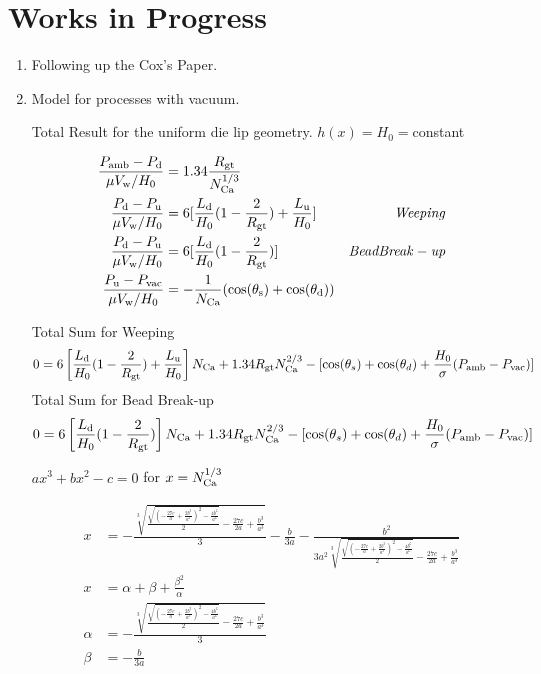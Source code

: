 \documentclass{article}
\begin{document}
\section{Works in Progress}
\begin{enumerate}
\item Following up the Cox's Paper.

\clearpage
\item Model for processes with vacuum. \newline 

Total Result for the uniform die lip geometry. $ h(x)=H_0 =$constant

\begin{align*} 
\frac{P_\textup{amb}-P_\textup{d}}{\mu V_\textup{w}/H_0} & =1.34\frac{R_\textup{gt}}{N_\textup{Ca}^{1/3}} &\\
\frac{P_\textup{d}-P_\textup{u}}{\mu V_\textup{w} /H_0 } & = 6[\frac{L_\textup{d}}{H_0}(1-\frac{2}{R_\textup{gt}}) +\frac{L_\textup{u}}{H_0}] & \mathit{Weeping} \\
 \frac{P_\textup{d}-P_\textup{u}}{\mu V_\textup{w} /H_0} & = 6[\frac{L_\textup{d}}{H_0}(1-\frac{2}{R_\textup{gt}})] & \mathit{Bead Break-up}\\
 \frac{P_\textup{u}-P_\textup{vac}}{\mu V_\textup{w} /H_0} & = -\frac{1}{N_\textup{Ca}} ( \cos(\theta _\textup{s})+\cos(\theta _\textup{d}))  &\\  
\end{align*}



Total Sum for Weeping
$$0=6\left [ \frac{L_\textup{d}}{H_0}(1-\frac{2}{R_\textup{gt}}) +\frac{L_\textup{u}}{H_0} \right ]N_\textup{Ca} +1.34R_\textup{gt}N_\textup{Ca}^{2/3} -[\cos(\theta_s)+ \cos(\theta_d)+\frac{H_0}{\sigma}(P_\textup{amb}-P_\textup{vac})] $$
Total Sum for Bead Break-up
$$0=6\left [ \frac{L_\textup{d}}{H_0}(1-\frac{2}{R_\textup{gt}})  \right ]N_\textup{Ca} +1.34R_\textup{gt}N_\textup{Ca}^{2/3} -[\cos(\theta_s)+ \cos(\theta_d)+\frac{H_0}{\sigma}(P_\textup{amb}-P_\textup{vac})] $$

$ ax^3+bx^2-c=0  $ for $x=N_\textup{Ca}^{1/3}$



\begin{equation}
\begin{split}
x & = -\frac{\sqrt[3]{\frac{\sqrt{\left(- \frac{27 c}{a} + \frac{2 b^{3}}{a^{3}}\right)^{2} - \frac{4 b^{6}}{a^{6}}}}{2} - \frac{27 c}{2 a} + \frac{b^{3}}{a^{3}}}}{3} - \frac{b}{3 a} - \frac{b^{2}}{3 a^{2} \sqrt[3]{\frac{\sqrt{\left(- \frac{27 c}{a} + \frac{2 b^{3}}{a^{3}}\right)^{2} - \frac{4 b^{6}}{a^{6}}}}{2} - \frac{27 c}{2 a} + \frac{b^{3}}{a^{3}}}} \\
x & = \alpha + \beta + \frac{\beta^2}{\alpha} \\
\alpha & = -\frac{\sqrt[3]{\frac{\sqrt{\left(- \frac{27 c}{a} + \frac{2 b^{3}}{a^{3}}\right)^{2} - \frac{4 b^{6}}{a^{6}}}}{2} - \frac{27 c}{2 a} + \frac{b^{3}}{a^{3}}}}{3} \\
\beta & = - \frac{b}{3 a}
\end{split}
\end{equation}


\end{enumerate}
\end{document}
